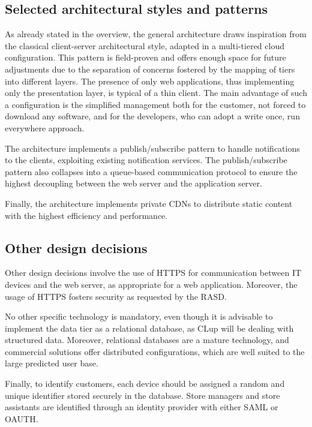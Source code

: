 \documentclass[../../main.tex]{subfiles}
\begin{document}
\subsection{Selected architectural styles and patterns}


    As already stated in the overview, the general architecture draws inspiration from the classical client-server architectural style, adapted in a multi-tiered cloud configuration.  
    This pattern is field-proven and offers enough space for future adjustments due to the separation of concerns fostered by the mapping of tiers into different layers.
    The presence of only web applications, thus implementing only the presentation layer, is typical of a thin client. The main advantage of such a configuration is the simplified management both for the customer, not forced to download any software, and for the developers, who can adopt a write once, run everywhere approach.

    The architecture implements a publish/subscribe pattern to handle notifications to the clients, exploiting existing notification services. 
    The publish/subscribe pattern also collapses into a queue-based communication protocol to ensure the highest decoupling between the web server and the application server.

    Finally, the architecture implements private CDNs to distribute static content with the highest efficiency and performance.

\subsection{Other design decisions}


    Other design decisions involve the use of HTTPS for communication between IT devices and the web server, as appropriate for a web application. 
    Moreover, the usage of HTTPS fosters security as requested by the RASD.

    No other specific technology is mandatory, even though it is advisable to implement the data tier as a relational database, 
    as CLup will be dealing with structured data. Moreover, relational databases are a mature technology, and commercial solutions offer distributed configurations, 
    which are well suited to the large predicted user base.

    Finally, to identify customers, each device should be assigned a random and unique identifier stored securely in the database. Store managers and store assistants are identified through
    an identity provider with either SAML or OAUTH.
\end{document}
